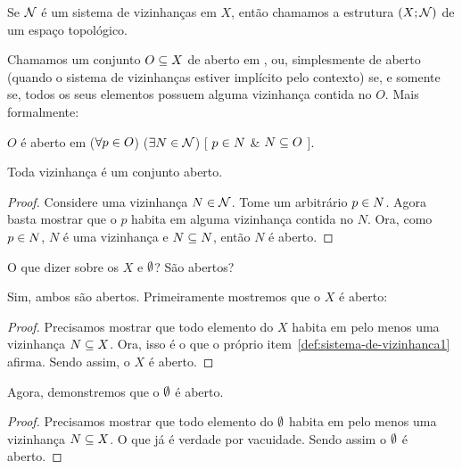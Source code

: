 \begin{definition}
	Se $\mathcal{N}$ é um sistema de vizinhanças em $X$, então chamamos a estrutura $(X;\mathcal{N})$ de um espaço topológico.
\end{definition}

\begin{definition}[Aberto]
\label{def:open}
	Chamamos um conjunto $O \subseteq X$ de aberto em , ou, simplesmente de aberto (quando o sistema de vizinhanças estiver implícito pelo contexto) se, e somente se, todos os seus elementos possuem alguma vizinhança contida no $O$. Mais formalmente:
	\begin{center}
		$O$ é aberto em  \sse
			($\forall p \in O$)%
			($\exists N \in \mathcal{N}$)%
			[ $p \in N$ \& $N \subseteq O$ ].
	\end{center}
\end{definition}

\begin{fact}
	\label{vizinhanca-aberto}
	Toda vizinhança é um conjunto aberto.
\end{fact}

\begin{proof}
	Considere uma vizinhança $N \in \mathcal{N}$. Tome um arbitrário $p \in N$. Agora basta mostrar que o $p$ habita em alguma vizinhança contida no $N$. Ora, como $p \in N$, $N$ é uma vizinhança e $N \subseteq N$, então $N$ é aberto.
\end{proof}

\begin{question}
	\label{universo-aberto}
	\label{vazio-aberto}
	O que dizer sobre os $X$ e $\emptyset$? São abertos?
\end{question}

\begin{answer}
	Sim, ambos são abertos. Primeiramente mostremos que o $X$ é aberto:
	\begin{proof}
		Precisamos mostrar que todo elemento do $X$ habita em pelo menos uma vizinhança $N \subseteq X$. Ora, isso é o que o próprio item~\ref{def:sistema-de-vizinhanca1} afirma. Sendo assim, o $X$ é aberto.
	\end{proof}
	Agora, demonstremos que o $\emptyset$ é aberto.
	\begin{proof}
		Precisamos mostrar que todo elemento do $\emptyset$ habita em pelo menos uma vizinhança $N \subseteq X$. O que já é verdade por vacuidade. Sendo assim o $\emptyset$ é aberto.
	\end{proof}
\end{answer}

